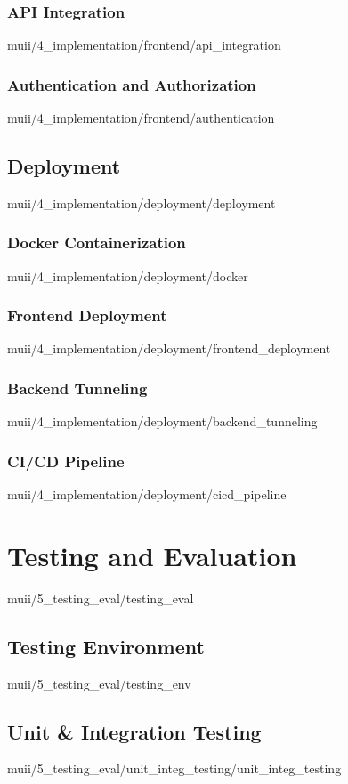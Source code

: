 \documentclass[english,epsbased,copyright,final,printable,covers,extendedindex,firstnumbered,tfm,gnuplot,loc,loe,lof,lot]{tfgtfmthesisuam}
\begin{document}
      \subsection{API Integration\label{SS:APIINTEG}}{muii/4_implementation/frontend/api_integration}
      \subsection{Authentication and Authorization\label{SS:AUTH}}{muii/4_implementation/frontend/authentication}

    \section{Deployment\label{SEC:DEPLOYMENT}}{muii/4_implementation/deployment/deployment}
      \subsection{Docker Containerization\label{SS:DOCKER}}{muii/4_implementation/deployment/docker}
      \subsection{Frontend Deployment\label{SS:FRONTDEPLOY}}{muii/4_implementation/deployment/frontend_deployment}
      \subsection{Backend Tunneling\label{SS:BACKTUNNEL}}{muii/4_implementation/deployment/backend_tunneling}
      \subsection{CI/CD Pipeline\label{SS:CICD}}{muii/4_implementation/deployment/cicd_pipeline}

  \chapter{Testing and Evaluation\label{CAP:TESTEVAL}}{muii/5_testing_eval/testing_eval}
    \section{Testing Environment\label{SEC:TESTENV}}{muii/5_testing_eval/testing_env}    

    \section{Unit \& Integration Testing\label{SEC:UNITINTEGTEST}}{muii/5_testing_eval/unit_integ_testing/unit_integ_testing}
\end{document}
